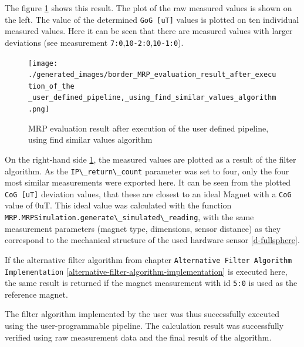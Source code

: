 The figure
\ref{MRP_evaluation_result_after_execution_of_the _user_defined_pipeline,_using_find_similar_values_algorithm.png}
shows this result. The plot of the raw measured values is shown on the
left. The value of the determined \passthrough{\lstinline!GoG [uT]!}
values is plotted on ten individual measured values. Here it can be seen
that there are measured values with larger deviations (see measurement
\passthrough{\lstinline!7:0!},\passthrough{\lstinline!10-2:0!},\passthrough{\lstinline!10-1:0!}).

\begin{figure}
\centering
\texttt{[image: ./generated\_images/border\_MRP\_evaluation\_result\_after\_execution\_of\_the \_user\_defined\_pipeline,\_using\_find\_similar\_values\_algorithm.png]}
\caption{MRP evaluation result after execution of the user defined
pipeline, using find similar values algorithm
\label{MRP_evaluation_result_after_execution_of_the _user_defined_pipeline,_using_find_similar_values_algorithm.png}}
\end{figure}

On the right-hand side
\ref{MRP_evaluation_result_after_execution_of_the _user_defined_pipeline,_using_find_similar_values_algorithm.png},
the measured values are plotted as a result of the filter algorithm. As
the \passthrough{\lstinline!IP\_return\_count!} parameter was set to
four, only the four most similar measurements were exported here. It can
be seen from the plotted \passthrough{\lstinline!CoG [uT]!} deviation
values, that these are closest to an ideal Magnet with a
\passthrough{\lstinline!CoG!} value of 0uT. This ideal value was
calculated with the function
\passthrough{\lstinline!MRP.MRPSimulation.generate\_simulated\_reading!},
with the same measurement parameters (magnet type, dimensions, sensor
distance) as they correspond to the mechanical structure of the used
hardware sensor \ref{d-fullsphere}.

If the alternative filter algorithm from chapter
\passthrough{\lstinline!Alternative Filter Algorithm Implementation!}
\ref{alternative-filter-algorithm-implementation} is executed here, the
same result is returned if the magnet measurement with \gls{id}
\passthrough{\lstinline!5:0!} is used as the reference magnet.

The filter algorithm implemented by the user was thus successfully
executed using the user-programmable pipeline. The calculation result
was successfully verified using raw measurement data and the final
result of the algorithm.

